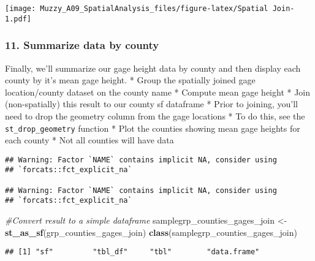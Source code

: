 \documentclass[]{article}
\newenvironment{Shaded}{\begin{snugshade}}{\end{snugshade}}
\newcommand{\KeywordTok}[1]{\textcolor[rgb]{0.13,0.29,0.53}{\textbf{#1}}}
\newcommand{\DataTypeTok}[1]{\textcolor[rgb]{0.13,0.29,0.53}{#1}}
\newcommand{\StringTok}[1]{\textcolor[rgb]{0.31,0.60,0.02}{#1}}
\newcommand{\CommentTok}[1]{\textcolor[rgb]{0.56,0.35,0.01}{\textit{#1}}}
\newcommand{\OperatorTok}[1]{\textcolor[rgb]{0.81,0.36,0.00}{\textbf{#1}}}
\newcommand{\NormalTok}[1]{#1}
\begin{document}
\texttt{[image: Muzzy\_A09\_SpatialAnalysis\_files/figure-latex/Spatial Join-1.pdf]}

\subsubsection{11. Summarize data by
county}\label{summarize-data-by-county}

Finally, we'll summarize our gage height data by county and then display
each county by it's mean gage height. * Group the spatially joined gage
location/county dataset on the county name * Compute mean gage height *
Join (non-spatially) this result to our county sf dataframe * Prior to
joining, you'll need to drop the geometry column from the gage locations
* To do this, see the \texttt{st\_drop\_geometry} function * Plot the
counties showing mean gage heights for each county * Not all counties
will have data

\begin{Shaded}
\end{Shaded}

\begin{verbatim}
## Warning: Factor `NAME` contains implicit NA, consider using
## `forcats::fct_explicit_na`

## Warning: Factor `NAME` contains implicit NA, consider using
## `forcats::fct_explicit_na`
\end{verbatim}

\begin{Shaded}
\begin{Highlighting}[]
\CommentTok{#Convert result to a simple dataframe}
\NormalTok{samplegrp_counties_gages_join <-}\StringTok{ }\KeywordTok{st_as_sf}\NormalTok{(grp_counties_gages_join)}
\KeywordTok{class}\NormalTok{(samplegrp_counties_gages_join)}
\end{Highlighting}
\end{Shaded}

\begin{verbatim}
## [1] "sf"         "tbl_df"     "tbl"        "data.frame"
\end{verbatim}
\end{document}
